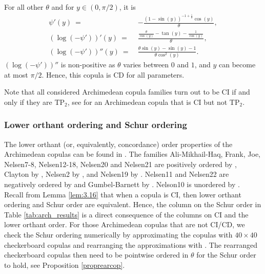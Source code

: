 \documentclass{article}
\newcommand{\TP}{\mathrm{TP_2}}
\begin{document}
\begin{itemize}
    For all other $\theta$ and for $y\in(0,\pi/2)$, it is
    \begin{align*}
        \psi'(y) ~=~ & - \frac{\left(1 - \sin{\left(y \right)}\right)^{-1 + \frac1{\theta}} \cos{\left(y \right)}}{\theta}, \\
        (\log(-\psi'))'(y) ~=~ & \frac{\frac{\theta}{\cos{\left(y \right)}} - \tan{\left(y \right)} - \frac1{\cos{\left(y \right)}}}{\theta}, \\
        (\log(-\psi'))''(y) ~=~ & \frac{\theta \sin{\left(y \right)} - \sin{\left(y \right)} - 1}{\theta \cos^2{\left(y \right)}}
    .\end{align*}
    $(\log(-\psi'))''$ is non-positive as $\theta$ varies between $0$ and $1$, and $y$ can become at most $\pi/2$.
    Hence, this copula is CD for all parameters.
\end{itemize}
Note that all considered Archimedean copula families turn out to be CI if and only if they are $\TP$, see \cite[Remark 2.13]{Mueller-2005} for an Archimedean copula that is CI but not $\TP$.

\subsubsection{Lower orthant ordering and Schur ordering}
\label{subsubsec:archimedean_lo_order}
The lower orthant (or, equivalently, concordance) order properties of the Archimedean copulas can be found in \cite{Nelsen-2006}.
The families Ali-Mikhail-Haq, Frank, Joe, Nelsen7-8, Nelsen12-18, Nelsen20 and Nelsen21 are positively ordered by \cite[Exercise 4.18 (a)]{Nelsen-2006}, Clayton by \cite[Exercise 4.14]{Nelsen-2006}, Nelsen2 by \cite[Exercise 4.23]{Nelsen-2006}, and Nelsen19 by \cite[Exercise 4.15]{Nelsen-2006}.
Nelsen11 and Nelsen22 are negatively ordered by \cite[Exercise 4.18 (b)]{Nelsen-2006} and Gumbel-Barnett by \cite[Example 4.10]{Nelsen-2006}.
Nelson10 is unordered by \cite[Exercise 4.16]{Nelsen-2006}. \\
Recall from Lemma \ref{lem:3.16} that when a copula is CI, then lower orthant ordering and Schur order are equivalent.
Hence, the column on the Schur order in Table \ref{tab:arch_results} is a direct consequence of the columns on CI and the lower orthant order.
For those Archimedean copulas that are not CI/CD, we check the Schur ordering numerically by approximating the copulas with $40\times 40$ checkerboard copulas and rearranging the approximations with \cite[Algorithm1]{strothmann2022rearranged}.
The rearranged checkerboard copulas then need to be pointwise ordered in $\theta$ for the Schur order to hold, see Proposition \ref{proprearcop}.
\end{document}
